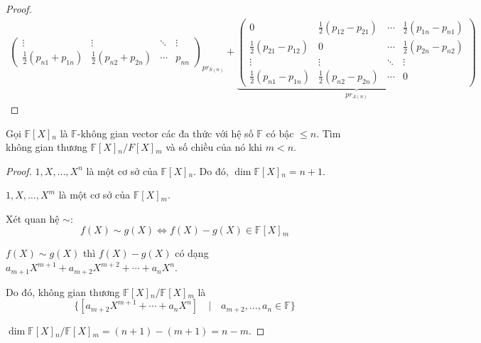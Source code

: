 \documentclass[class=linearalgebra,crop=false]{standalone}
\begin{document}
\begin{proof}
\begin{gather*}
{\begin{pmatrix}
                \vdots                       & \vdots                       & \ddots & \vdots                       \\
                \frac{1}{2}(p_{n1} + p_{1n}) & \frac{1}{2}(p_{n2} + p_{2n}) & \cdots & p_{nn}
            \end{pmatrix}
        }_{pr_{S(n)}}+
        \underbrace{
            \begin{pmatrix}
                0                            & \frac{1}{2}(p_{12} - p_{21}) & \cdots & \frac{1}{2}(p_{1n} - p_{n1}) \\
                \frac{1}{2}(p_{21} - p_{12}) & 0                            & \cdots & \frac{1}{2}(p_{2n} - p_{n2}) \\
                \vdots                       & \vdots                       & \ddots & \vdots                       \\
                \frac{1}{2}(p_{n1} - p_{1n}) & \frac{1}{2}(p_{n2} - p_{2n}) & \cdots & 0
            \end{pmatrix}
        }_{pr_{A(n)}}
    \end{gather*}
\end{proof}

\begin{exercise}
    Gọi $\mathbb{F}[X]{}_{n}$ là $\mathbb{F}$-không gian vector các đa thức với hệ số $\mathbb{F}$ có bậc $\le n$. Tìm không gian thương $\mathbb{F}[X]{}_{n}/F[X]{}_{m}$ và số chiều của nó khi $m < n$.
\end{exercise}

\begin{proof}
    $1, X, \ldots, X^{n}$ là một cơ sở của $\mathbb{F}[X]{}_{n}$. Do đó, $\dim \mathbb{F}[X]{}_{n} = n + 1$.
    \par $1, X, \ldots, X^{m}$ là một cơ sở của $\mathbb{F}[X]{}_{m}$.
    \par Xét quan hệ $\sim$:
    \[ f(X)\sim g(X) \Longleftrightarrow f(X) - g(X) \in \mathbb{F}[X]{}_{m} \]
    \par $f(X) \sim g(X)$ thì $f(X) - g(X)$ có dạng $a_{m+1}X^{m+1} + a_{m+2}X^{m+2} + \cdots + a_{n}X^{n}$.
    \par Do đó, không gian thương $\mathbb{F}[X]{}_{n}/\mathbb{F}[X]{}_{m}$ là
    \[ \{ [a_{m+2}X^{m+1} + \cdots + a_{n}X^{n}] \quad\vert\quad a_{m+2}, \ldots, a_{n}\in\mathbb{F} \} \]
    \par $\dim\mathbb{F}[X]{}_{n}/\mathbb{F}[X]{}_{m} = (n + 1) - (m + 1) = n - m$.
\end{proof}
\end{document}
